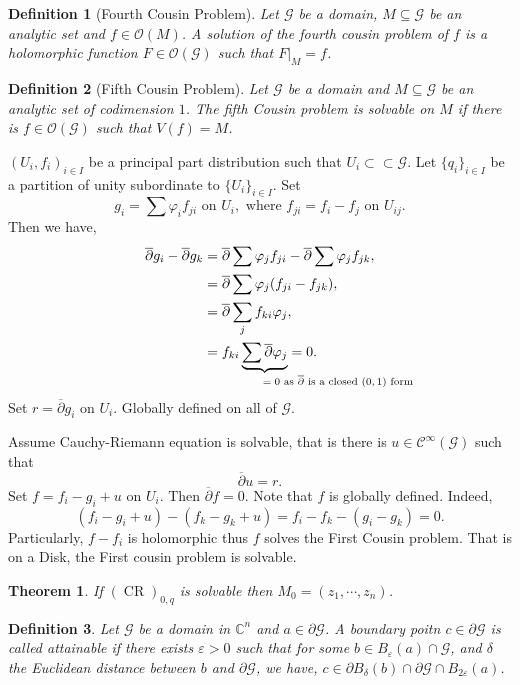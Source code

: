 \documentclass{article}
\newtheorem{theorem}{Theorem} [section]
\newtheorem{definition}{Definition}[section]
\DeclareMathOperator{\CR}{CR}
\newcommand{\C}[0]{\mathbb{C}}
\newcommand{\G}[0]{\mathcal{G}}
\newcommand{\bd}[0]{\partial}
\newcommand{\Ouv}[0]{\mathcal{O}}
\newcommand{\compembed}[0]{\subset\subset}
\newcommand{\cpd}[0]{\overline{\partial}}
\newcommand{\on}[0]{\text{ on }}
\newcommand{\ck}[1]{\mathcal{C}^{#1}}
\newcommand{\cinf}[0]{\ck{\infty}}
\begin{document}
  \begin{definition}[Fourth Cousin Problem]
    Let $\G$ be a domain, $M\subseteq\G$ be an analytic set and $f\in\Ouv(M)$. A solution of the fourth cousin problem of $f$ is a holomorphic function $F\in\Ouv(\G)$ such that $F|_M=f$.
  \end{definition}
\begin{definition}[Fifth Cousin Problem]
  Let $\G$ be a domain and $M\subseteq\G$ be an analytic set of codimension $1$. The fifth Cousin problem is solvable on $M$ if there is $f\in\Ouv(\G)$ such that $V(f) = M$. 
\end{definition}
  $(U_i,f_i)_{i\in I}$ be a principal part distribution such that $U_i\compembed \G$. Let $\{q_i\}_{i\in I}$ be a partition of unity subordinate to $\{U_i\}_{i\in I}$. Set 
  \begin{equation*}
    g_i = \sum\varphi_if_{ji}\on U_i,\text{ where } f_{ji} = f_i-f_j\on U_{ij}.
  \end{equation*}
  Then we have,
  \begin{align*}
    \cpd g_i - \cpd g_k &= \cpd\sum\varphi_jf_{ji}-\cpd\sum\varphi_j f_{jk},\\
& = \cpd\sum\varphi_j(f_{ji}-f_{jk}),\\
& = \cpd\sum_j f_{ki}\varphi_j,\\
&= f_{ki}\underbrace{\sum\cpd\varphi_j}_{\mathrlap{\!\text{$=0$ as $\cpd$ is a closed $(0,1)$ form}}} = 0.
  \end{align*}
  Set $r = \cpd g_i$ on $U_i$. Globally defined on all of $\G$.

\par Assume Cauchy-Riemann equation is solvable, that is there is $u\in\cinf(\G)$ such that 
\begin{equation*}
  \cpd u = r.
\end{equation*}
Set $f=f_i-g_i+u$ on $U_i$. Then $\cpd f = 0$. Note that $f$ is globally defined. Indeed,
\begin{equation*}
  (f_i-g_i+u)-(f_k-g_k+u) = f_i-f_k-(g_i-g_k) = 0.
\end{equation*}
Particularly, $f-f_i$ is holomorphic thus $f$ solves the First Cousin problem. That is on a Disk, the First cousin problem is solvable.

\begin{theorem}
  \label{theorem_2_2_cr}
  If $(\CR)_{0,q}$ is solvable then $M_0 = (z_1,\cdots,z_n)$.
\end{theorem}

\begin{definition}
   Let $\G$ be a domain in $\C^n$ and $a\in\bd\G$. A boundary poitn $c\in \bd\G$ is called attainable if there exists $\varepsilon>0$ such that for some $b\in B_\varepsilon(a)\cap \G$, and $\delta$ the Euclidean distance between $b$ and $\bd\G$, we have, $c\in \bd B_\delta(b)\cap\bd\G\cap B_{2\varepsilon}(a)$.
\end{definition}
\end{document}
